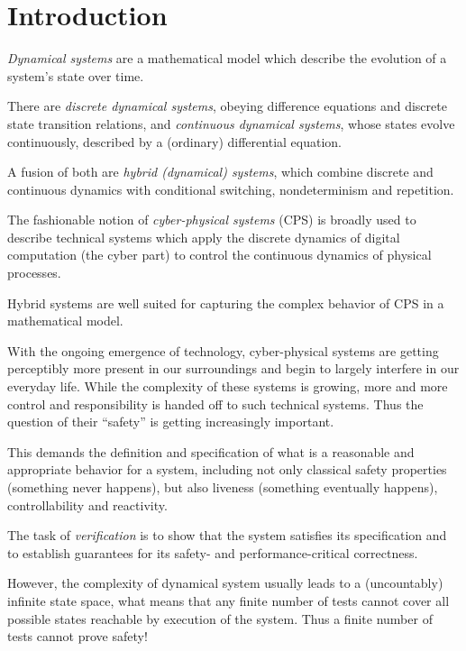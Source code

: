 \chapter{Introduction}

    \emph{Dynamical systems} are a mathematical model which describe the evolution of a system's
    state over time.
    
    There are \emph{discrete dynamical systems}, obeying difference equations and discrete state transition relations,
    and \emph{continuous dynamical systems}, whose states evolve continuously, described by a (ordinary) differential equation.

    A fusion of both are \emph{hybrid (dynamical) systems}, which combine discrete and continuous dynamics with conditional switching, nondeterminism and repetition.

    
    The fashionable notion of \emph{cyber-physical systems} (CPS) is broadly used to describe technical systems which apply the discrete dynamics of digital computation (the cyber part) to control the continuous dynamics of physical processes.

    Hybrid systems are well suited for capturing the complex behavior of CPS in a mathematical model.

    With the ongoing emergence of technology, cyber-physical systems are getting perceptibly more present in our surroundings and begin to largely interfere in our everyday life.
    While the complexity of these systems is growing, more and more control and responsibility is handed off to such technical systems.
    Thus the question of their ``safety'' is getting increasingly important.
    
    This demands the definition and specification of what is a reasonable and appropriate behavior for a system, including not only classical safety properties (something never happens), but also liveness (something eventually happens), controllability and reactivity.

    The task of \emph{verification} is to show that the system satisfies its specification and to establish guarantees for its safety- and performance-critical correctness.

    However, the complexity of dynamical system usually leads to a (uncountably) infinite state space, what means that any finite number of tests cannot cover all possible states reachable by execution of the system. Thus a finite number of tests cannot prove safety!
    
